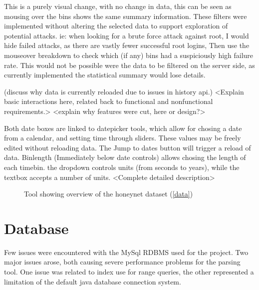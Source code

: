 This is a purely visual change, with no change in data, this can be seen as mousing over the bins shows the same summary information. These filters were implemented without altering the selected data to support exploration of potential attacks. ie: when looking for a brute force attack against root, I would hide failed attacks, as there are vastly fewer successful root logins, Then use the mouseover breakdown to check which (if any) bins had a suspiciously high failure rate. This would not be possible were the data to be filtered on the server side, as currently implemented the statistical summary would lose details.

  

(discuss why data is currently reloaded due to issues in history api.) 
<Explain basic interactions here, related back to functional and nonfunctional requirements.>
<explain why features were cut, here or design?>

Both date boxes are linked to datepicker tools, which allow for chosing a date from a calendar, and setting time through sliders. These values may be freely edited without reloading data. The Jump to dates button will trigger a reload of data. 
Binlength (Immediately below date controls) allows chosing the length of each timebin. the dropdown controls units (from seconds to years), while the textbox accepts a number of units.
<Complete detailed description>
\begin{figure}[h!]
\caption{\protect\label{overview}Tool showing overview of the honeynet dataset (\ref{data})}
\end{figure}


\section{Database}\label{imp_db}
Few issues were encountered with the MySql RDBMS used for the project. Two major issues arose, both causing severe performance problems for the parsing tool. One issue was related to index use for range queries, the other represented a limitation of the default java database connection system. 

